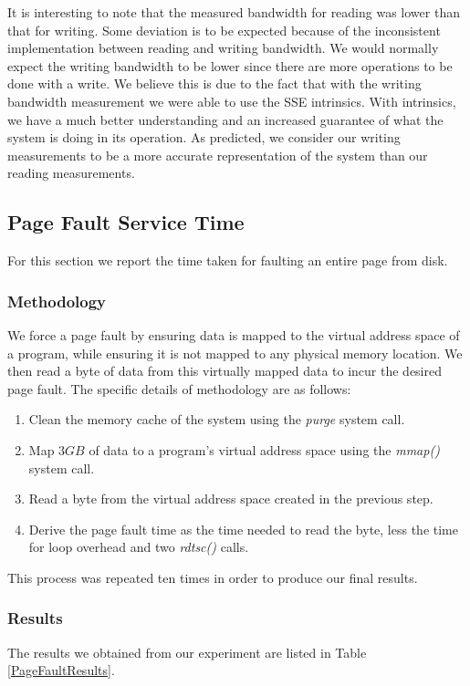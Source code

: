 \documentclass[sigconf]{acmart}
\begin{document}
It is interesting to note that the measured bandwidth for reading was lower than that for writing. Some deviation is to be expected because of the inconsistent implementation between reading and writing bandwidth. We would normally expect the writing bandwidth to be lower since there are more operations to be done with a write. We believe this is due to the fact that with the writing bandwidth measurement we were able to use the SSE intrinsics. With intrinsics, we have a much better understanding and an increased guarantee of what the system is doing in its operation. As predicted, we consider our writing measurements to be a more accurate representation of the system than our reading measurements.

\subsection{Page Fault Service Time}
For this section we report the time taken for faulting an entire page from disk. 

\subsubsection{Methodology}
We force a page fault by ensuring data is mapped to the virtual address space of a program, while ensuring it is not mapped to any physical memory location. We then read a byte of data from this virtually mapped data to incur the desired page fault. The specific details of methodology are as follows:

\begin{enumerate}
	\item Clean the memory cache of the system using the \textit{purge} system call. 
	\item Map $3GB$ of data to a program's virtual address space using the \textit{mmap()} system call.
	\item Read a byte from the virtual address space created in the previous step.
	\item Derive the page fault time as the time needed to read the byte, less the time for loop overhead and two \textit{rdtsc()} calls.
\end{enumerate}

This process was repeated ten times in order to produce our final results.

\subsubsection{Results}
The results we obtained from our experiment are listed in Table \ref{PageFaultResults}.
\end{document}
